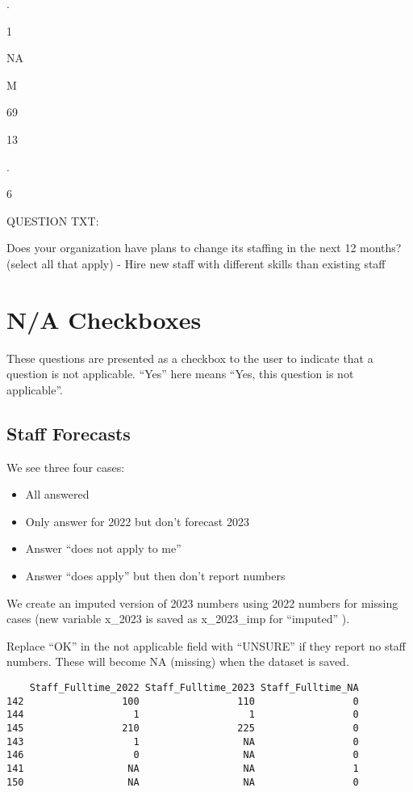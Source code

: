 \documentclass[
  letterpaper,
]{scrbook}
\providecommand{\tightlist}{%
  \setlength{\itemsep}{0pt}\setlength{\parskip}{0pt}}\usepackage{longtable,booktabs,array}
\begin{document}
.

1

NA

M

69

13

.

6

QUESTION TXT:

Does your organization have plans to change its staffing in the next 12
months? (select all that apply) - Hire new staff with different skills
than existing staff

\section{N/A Checkboxes}\label{na-checkboxes-1}

These questions are presented as a checkbox to the user to indicate that
a question is not applicable. ``Yes'' here means ``Yes, this question is
not applicable''.

\subsection{Staff Forecasts}\label{staff-forecasts}

We see three four cases:

\begin{itemize}
\tightlist
\item
  All answered
\item
  Only answer for 2022 but don't forecast 2023
\item
  Answer ``does not apply to me''
\item
  Answer ``does apply'' but then don't report numbers
\end{itemize}

We create an imputed version of 2023 numbers using 2022 numbers for
missing cases (new variable x\_2023 is saved as x\_2023\_imp for
``imputed'' ).

Replace ``OK'' in the not applicable field with ``UNSURE'' if they
report no staff numbers. These will become NA (missing) when the dataset
is saved.

\begin{verbatim}
    Staff_Fulltime_2022 Staff_Fulltime_2023 Staff_Fulltime_NA
142                 100                 110                 0
144                   1                   1                 0
145                 210                 225                 0
143                   1                  NA                 0
146                   0                  NA                 0
141                  NA                  NA                 1
150                  NA                  NA                 0
\end{verbatim}
\end{document}
